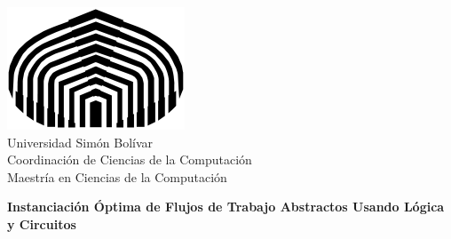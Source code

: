 \begin{titlepage}

\begin{flushleft}
\includegraphics[scale=0.3]{graphics/logo_usb.png} \\
Universidad Simón Bolívar \\
Coordinación de Ciencias de la Computación \\
Maestría en Ciencias de la Computación \\
\end{flushleft}

\vspace{0.8cm}

\begin{center}
{\large \bf \textsf{Instanciación Óptima de Flujos de Trabajo Abstractos Usando Lógica y Circuitos}}
\end{center}

\vspace{0.2cm}


\end{titlepage}
